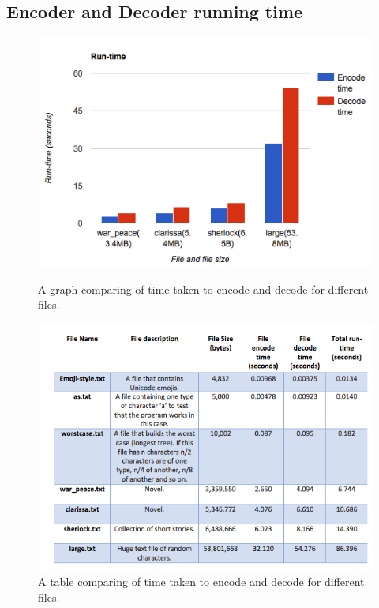 \documentclass{mm2}
\begin{document}
\subsection{Encoder and Decoder running time}
\begin{figure}[ht]
  \includegraphics[width=\linewidth]{figures/timegraph.png}
  \caption{A graph comparing of time taken to encode and decode for different files.}\label{fig:timegraph}
\endminipage\hfill
{}%
  \includegraphics[width=\linewidth]{figures/timetable.png}
  \caption{A table comparing of time taken to encode and decode for different files.}\label{fig:timetable}
\endminipage
\end{figure}
\end{document}
